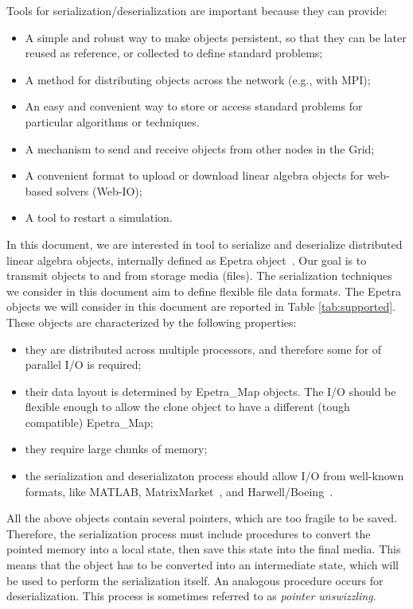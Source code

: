 \documentclass[11pt,relax]{SANDreport}
\begin{document}
Tools for serialization/deserialization are important because they can
provide:
\begin{itemize}
\item A simple and robust way to make objects persistent, so that they can be
later reused as reference, or collected to define standard problems;
\item A method for distributing objects across the network (e.g., with MPI);
\item An easy and convenient way to store or access standard problems for particular algorithms or techniques.
\item A mechanism to send and receive objects from other nodes in the Grid;
\item A convenient format to upload or download linear algebra objects for
web-based solvers (Web-IO);
\item A tool to restart a simulation.
\end{itemize}
In this document, we are interested in tool to serialize and
deserialize distributed linear algebra objects, internally defined
as Epetra object~\cite{Epetra-Users-Guide}. Our goal is to transmit
objects to and from storage media (files). The serialization
techniques we consider in this document aim to define flexible file
data formats. The Epetra objects we will consider in this document
are reported in Table \ref{tab:supported}. These objects are
characterized by the following properties:
\begin{itemize}
\item they are distributed across multiple processors, and therefore some for
of parallel I/O is required;
\item their data layout is determined by Epetra\_Map objects. The I/O should
be flexible enough to allow the clone object to have a different (tough
                                                                  compatible)
Epetra\_Map;
\item they require large chunks of memory;
\item the serialization and deserializaton process should allow I/O from
well-known formats, like MATLAB, MatrixMarket~\cite{boisvert97matrix}, and
Harwell/Boeing~\cite{duff89sparse}.
\end{itemize}
All the above objects
contain several pointers, which are too fragile to be saved. Therefore,
        the serialization process
must include procedures to convert the pointed memory into a local state, then
save this state into the final media. This means that the object has to be
converted into an intermediate state, which will be used to perform the
serialization itself. An analogous procedure occurs for deserialization. This
process is sometimes referred to as {\sl pointer unswizzling}.
\end{document}
